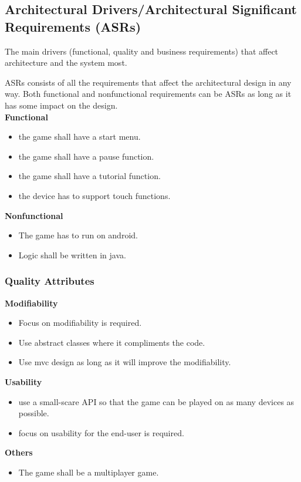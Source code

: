 \subsection{Architectural Drivers/Architectural Significant Requirements (ASRs)}
The main drivers (functional, quality and business requirements) that affect architecture and the system most.

ASRs consists of all the requirements that affect the architectural design in any way. Both functional and nonfunctional requirements can be ASRs as long as it has some impact on the design.\\


\textbf{Functional} 
\begin{itemize}
	\item the game shall have a start menu.
	\item the game shall have a pause function.
	\item the game shall have a tutorial function.
	\item the device has to support touch functions.
\end{itemize}

\textbf{Nonfunctional}
\begin{itemize}
	\item The game has to run on android.
	\item Logic shall be written in java.
\end{itemize}

\subsubsection{Quality Attributes}

\textbf{Modifiability}
\begin{itemize}
	\item Focus on modifiability is required.
	\item Use abstract classes where it compliments the code.
	\item Use mvc design as long as it will improve the modifiability.
\end{itemize}

\textbf{Usability}
\begin{itemize}
	\item use a small-scare API so that the game can be played on as many devices as possible.
	\item focus on usability for the end-user is required.
\end{itemize}

\textbf{Others}
\begin{itemize}
	\item The game shall be a multiplayer game.
\end{itemize}